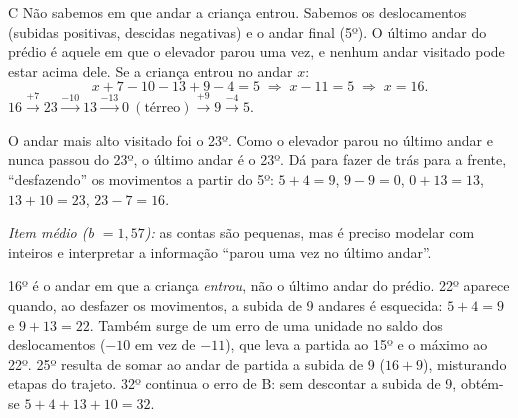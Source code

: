 \begin{resolucao}{C}
 Não sabemos em que andar a criança entrou. Sabemos os
deslocamentos (subidas positivas, descidas negativas) e o andar final (5º). O último andar do prédio
é aquele em que o elevador parou uma vez, e nenhum andar visitado pode estar acima dele.
 Se a criança entrou no andar $x$:
\[x+7-10-13+9-4=5 \;\Longrightarrow\; x-11=5 \;\Longrightarrow\; x=16.\]
 $16 \xrightarrow{+7} 23 \xrightarrow{-10} 13 \xrightarrow{-13} 0\ (\text{térreo})
\xrightarrow{+9} 9 \xrightarrow{-4} 5$.

O andar mais alto visitado foi o 23º. Como o elevador parou no último andar e nunca passou do 23º,
o último andar é o 23º.
 Dá para fazer de trás para a frente, ``desfazendo'' os movimentos a partir do 5º:
$5+4=9$, $9-9=0$, $0+13=13$, $13+10=23$, $23-7=16$.

\textit{Item médio (b $=1,57$):} as contas são pequenas, mas é preciso modelar com inteiros e
interpretar a informação ``parou uma vez no último andar''.
\begin{distratores}
 16º é o andar em que a criança \emph{entrou}, não o último andar do prédio.
 22º aparece quando, ao desfazer os movimentos, a subida de 9 andares é esquecida:
$5+4=9$ e $9+13=22$. Também surge de um erro de uma unidade no saldo dos deslocamentos
($-10$ em vez de $-11$), que leva a partida ao 15º e o máximo ao 22º.
 25º resulta de somar ao andar de partida a subida de 9 ($16+9$), misturando etapas do trajeto.
 32º continua o erro de B: sem descontar a subida de 9, obtém-se $5+4+13+10=32$.
\end{distratores}
\end{resolucao}


